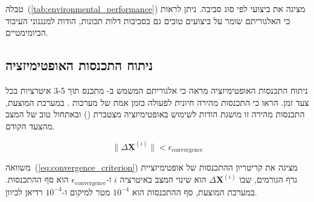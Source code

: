 \begin{table}[htbp]
    \centering
    \caption{ביצועי  לפי סוג סביבה. (BioSLAM performance by environment type.)}
    \label{tab:environmental_performance}
\end{table}

טבלה~(\ref{tab:environmental_performance}) מציגה את ביצועי  לפי סוג סביבה. ניתן לראות כי האלגוריתם שומר על ביצועים טובים גם בסביבות דלות תכונות, הודות למנגנוני העיבוד הביומימטיים.

\subsection{ניתוח התכנסות האופטימיזציה}
\label{sec:optimization_convergence}

ניתוח התכנסות האופטימיזציה מראה כי אלגוריתם  המשמש ב- מתכנס תוך 3-5 איטרציות בכל צעד זמן. \citet{Kaess2012} הראו כי התכנסות מהירה חיונית לפעולה בזמן אמת של מערכות . במערכת המוצעת, התכנסות מהירה זו מושגת הודות לשימוש באופטימיזציה מצטברת () ובאתחול טוב של המצב מהצעד הקודם.

\begin{equation}
\| \Delta\mathbf{X}^{(i)} \| < \epsilon_{\text{convergence}}
\label{eq:convergence_criterion}
\end{equation}

משוואה~(\ref{eq:convergence_criterion}) מציגה את קריטריון ההתכנסות של אופטימיזציית גרף הגורמים, שבו $\Delta\mathbf{X}^{(i)}$ הוא שינוי המצב באיטרציה $i$ ו-$\epsilon_{\text{convergence}}$ הוא סף ההתכנסות. במערכת המוצעת, סף ההתכנסות הוא $10^{-4}$ מטר למיקום ו-$10^{-4}$ רדיאן לכיוון.
